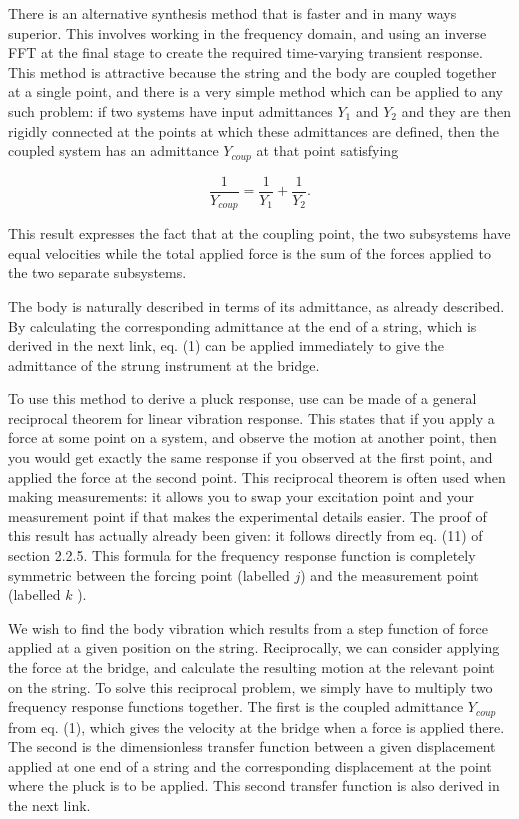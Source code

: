   There is an alternative synthesis method that is faster and in many ways 
  superior. This involves working in the frequency domain, and using an inverse 
  FFT at the final stage to create the required time-varying transient 
  response. This method is attractive because the string and the body are 
  coupled together at a single point, and there is a very simple method which 
  can be applied to any such problem: if two systems have input admittances 
  $Y_1$ and $Y_2$ and they are then rigidly connected at the points at which 
  these admittances are defined, then the coupled system has an admittance 
  $Y_{coup}$ at that point satisfying 

  \begin{equation*}\dfrac{1}{Y_{coup}}=\dfrac{1}{Y_1}+\dfrac{1}{Y_2} . 
  \tag{1}\end{equation*} 

  This result expresses the fact that at the coupling point, the two subsystems 
  have equal velocities while the total applied force is the sum of the forces 
  applied to the two separate subsystems. 

  The body is naturally described in terms of its admittance, as already 
  described. By calculating the corresponding admittance at the end of a 
  string, which is derived in the next link, eq. (1) can be applied immediately 
  to give the admittance of the strung instrument at the bridge. 

  To use this method to derive a pluck response, use can be made of a general 
  reciprocal theorem for linear vibration response. This states that if you 
  apply a force at some point on a system, and observe the motion at another 
  point, then you would get exactly the same response if you observed at the 
  first point, and applied the force at the second point. This reciprocal 
  theorem is often used when making measurements: it allows you to swap your 
  excitation point and your measurement point if that makes the experimental 
  details easier. The proof of this result has actually already been given: it 
  follows directly from eq. (11) of section 2.2.5. This formula for the 
  frequency response function is completely symmetric between the forcing point 
  (labelled $j$) and the measurement point (labelled $k$ ). 

  We wish to find the body vibration which results from a step function of 
  force applied at a given position on the string. Reciprocally, we can 
  consider applying the force at the bridge, and calculate the resulting motion 
  at the relevant point on the string. To solve this reciprocal problem, we 
  simply have to multiply two frequency response functions together. The first 
  is the coupled admittance $Y_{coup}$ from eq. (1), which gives the velocity 
  at the bridge when a force is applied there. The second is the dimensionless 
  transfer function between a given displacement applied at one end of a string 
  and the corresponding displacement at the point where the pluck is to be 
  applied. This second transfer function is also derived in the next link. 

